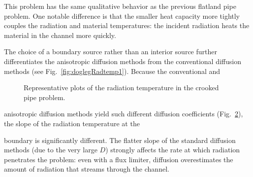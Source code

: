 This problem has the same qualitative behavior as the previous flatland pipe
problem. One notable difference is that the smaller heat capacity more tightly
couples the radiation and material temperatures: the incident radiation heats
the material in the channel more quickly.

The choice of a boundary source rather than an interior source further
differentiates the anisotropic diffusion methods from the conventional diffusion
methods (see Fig.~\ref{fig:doglegRadtemp1}). Because the conventional and
%
\begin{figure}[htb]
  \centering\small
  \subfloat[Leg 1 at $t=0.5$]{%
    \hspace{-.25in}%
    
    \label{fig:doglegRadtemp1}
  }%
  \subfloat[Leg 2 at $t=2.0$]{%
    \hspace{-.25in}%
    
    \label{fig:doglegRadtemp2}
  }%
  \caption{Representative plots of the radiation temperature in the crooked
  pipe problem.}
  \label{fig:doglegRadtemp}
\end{figure}
%
anisotropic diffusion methods yield such different diffusion coefficients
(Fig.~\ref{fig:doglegDcoeff}), the slope of the radiation temperature at the
%
\begin{figure}[htb]
  \centering\small
  \subfloat[Leg 1]{%
    \hspace{-.25in}%
    
  }%
  \subfloat[Leg 2]{%
    \hspace{-.25in}%
    
  }%
  \label{fig:doglegDcoeff}
\end{figure}
%
boundary is significantly different. The flatter slope of the standard
diffusion methods (due to the very large $D$) strongly affects the rate at which
radiation penetrates the problem: even with a flux limiter, diffusion
overestimates the amount of radiation that streams through the channel.

